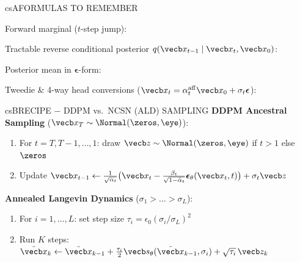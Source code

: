 \documentclass[../../../../master.tex]{subfiles}
\begin{document}
\begin{cscolumns}
\begin{cscard}{csA}{FORMULAS TO REMEMBER}
  \begin{csbul}
    \item Forward marginal ($t$-step jump):
    \item Tractable reverse conditional posterior $q(\vecb x_{t-1}\mid\vecb x_t,\vecb x_0)$:
    \item Posterior mean in $\boldsymbol\epsilon$-form:
    \item Tweedie \& 4-way head conversions ($\vecb x_t=\alpha_t^{\mathrm{aff}}\vecb x_0+\sigma_t\boldsymbol\epsilon$):
  \end{csbul}
\end{cscard}

\begin{cscard}{csB}{RECIPE $-$ DDPM vs.\ NCSN (ALD) SAMPLING}
  \textbf{DDPM Ancestral Sampling} ($\vecb x_T\sim\Normal(\zeros,\eye)$):
  \begin{enumerate}[leftmargin=1.2em, itemsep=1pt, topsep=1pt, parsep=0pt]
    \item For $t=T,T-1,\dots,1$: draw $\vecb z\sim\Normal(\zeros,\eye)$ if $t>1$ else $\zeros$
    \item Update $\vecb x_{t-1}\gets\frac{1}{\sqrt{\alpha_t}}\bigl(\vecb x_t-\frac{\beta_t}{\sqrt{1-\bar\alpha_t}}\boldsymbol\epsilon_\theta(\vecb x_t,t)\bigr)+\sigma_t\vecb z$
  \end{enumerate}
  \vspace{2pt}
  \textbf{Annealed Langevin Dynamics} ($\sigma_1>\dots>\sigma_L$):
  \begin{enumerate}[leftmargin=1.2em, itemsep=1pt, topsep=1pt, parsep=0pt]
    \item For $i=1,\dots,L$: set step size $\tau_i=\epsilon_0(\sigma_i/\sigma_L)^2$
    \item Run $K$ steps: $\tilde{\vecb x}_k\gets\tilde{\vecb x}_{k-1}+\frac{\tau_i}{2}\vecb s_\theta(\tilde{\vecb x}_{k-1},\sigma_i)+\sqrt{\tau_i}\,\vecb z_k$
  \end{enumerate}
\end{cscard}
\columnbreak


\end{cscolumns}
\end{document}
